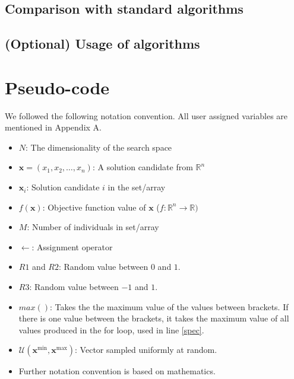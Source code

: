 \documentclass[runningheads]{llncs}
\begin{document}
\subsection{Comparison with standard algorithms}


\subsection{(Optional) Usage of algorithms}


\section{Pseudo-code}
\label{secPseu}
We followed the following notation convention. All user assigned variables are mentioned in Appendix A.
\begin{itemize}
    \item $N$: The dimensionality of the search space
    \item $\mathbf{x}=(x_1,x_2,\dots,x_n)$: A solution candidate from $\mathds{R}^n$
    \item $\mathbf{x}_i$: Solution candidate $i$ in the set/array
    \item $f(\mathbf{x})$: Objective function value of $\mathbf{x}$ ($f: \mathds{R}^n \rightarrow \mathds{R})$
    \item $M$: Number of individuals in set/array
    \item $\leftarrow$: Assignment operator
    \item $ R1 $ and $R2 $:  Random value between $ 0 $ and $ 1$.
    \item $ R3 $: Random value between $ -1 $ and $ 1$.
    \item $ max() $: Takes the the maximum value of the values between brackets. If there is one value between the brackets, it takes the maximum value of all values produced in the for loop, used in line \ref{spec}.
    \item $ \bm{\mathcal{U}}(\mathbf{x}^{\text{min}},\mathbf{x}^{\text{max}} ) $: Vector sampled uniformly at random.
    \item Further notation convention is based on mathematics.
\end{itemize}
\end{document}
